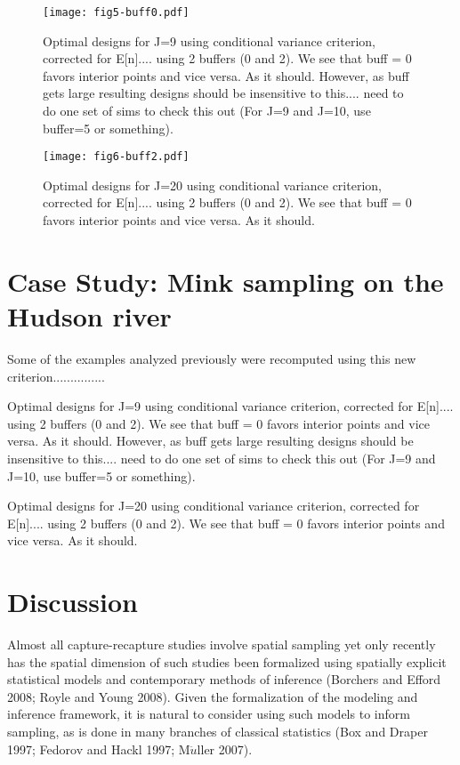 \documentclass[useAMS,referee]{biom}
\begin{document}
\begin{figure}
\centering
\texttt{[image: fig5-buff0.pdf]}
\caption{
Optimal designs for J=9 using conditional variance criterion,
corrected for E[n].... using 2 buffers (0 and 2). We see that buff = 0
favors interior points and vice versa. As it should.  However, as buff
gets large resulting designs should be insensitive to this.... need to
do one set of sims to check this out (For J=9 and J=10, use buffer=5
or something).
}
\label{fig.fig5}
\end{figure}


\begin{figure}
\centering
\texttt{[image: fig6-buff2.pdf]}
\caption{
Optimal designs for J=20 using conditional variance criterion,
corrected for E[n].... using 2 buffers (0 and 2). We see that buff = 0
favors interior points and vice versa. As it should. 
}
\label{fig.fig6}
\end{figure}


\section{Case Study: Mink sampling on the Hudson river}

Some of the examples analyzed previously were recomputed using this
new criterion...............

Optimal designs for J=9 using conditional variance criterion,
corrected for E[n].... using 2 buffers (0 and 2). We see that buff = 0
favors interior points and vice versa. As it should.  However, as buff
gets large resulting designs should be insensitive to this.... need to
do one set of sims to check this out (For J=9 and J=10, use buffer=5
or something).

Optimal designs for J=20 using conditional variance criterion,
corrected for E[n].... using 2 buffers (0 and 2). We see that buff = 0
favors interior points and vice versa. As it should. 



\section{Discussion}

Almost all capture-recapture studies involve spatial sampling yet only
recently has the spatial dimension of such studies been formalized
using spatially explicit statistical models and contemporary methods
of inference (Borchers and Efford 2008; Royle and Young 2008).  Given
the formalization of the modeling and inference framework, it is
natural to consider using such models to inform sampling, as is done
in many branches of classical statistics (Box and Draper 1997; Fedorov
and Hackl 1997; M$\ddot{u}$ller 2007).
\end{document}
